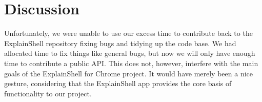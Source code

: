 \documentclass[11pt]{article}
\begin{document}
\section{Discussion}

Unfortunately, we were unable to use our excess time to contribute back to the
ExplainShell repository fixing bugs and tidying up the code base. We had
allocated time to fix things like general bugs, but now we will only have enough
time to contribute a public API. This does not, however, interfere with the main
goals of the ExplainShell for Chrome project. It would have merely been a nice
gesture, considering that the ExplainShell app provides the core basis of
functionality to our project.
\end{document}
